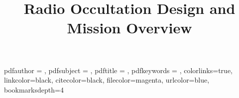 \title{Radio Occultation Design and Mission Overview}

\subject{Radio Occultation} 

\newcommand{\stringconv}[1]{%
    \edef\stringvalue{#1}%
}
\stringconv{\printsubject}
\expandafter\DTLstoreinitials\expandafter{\stringvalue}{\subjectinitials}
\stringconv{\printtype}
\expandafter\DTLstoreinitials\expandafter{\stringvalue}{\typeinitials}




\hypersetup
{
    pdfauthor   = {\printlab},
    pdfsubject  = {\printsubject},
    pdftitle    = {\printtitle},
    pdfkeywords = {\printkeywords},
    colorlinks=true,       		
    linkcolor=black,          	
    citecolor=black,        		
    filecolor=magenta,      		
    urlcolor=blue,
    bookmarksdepth=4
}

